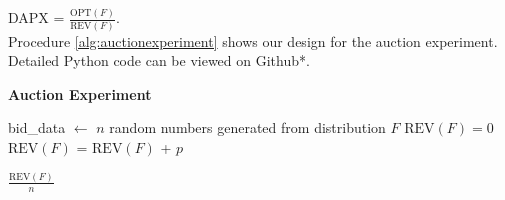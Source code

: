 DAPX = $\frac{\text{OPT}(F)}{\text{REV}(F)}$.\\
Procedure \ref{alg:auctionexperiment} shows our design for the auction experiment. Detailed Python code can be viewed on Github*.
\begin{algorithm}
\caption{\textbf{Auction Experiment}} \label{alg:auctionexperiment}
\begin{algorithmic}[1]
	 
	
		\State bid\_data $\gets$ $n$ random numbers generated from distribution $F$ 
		\State $\text{REV}(F) = 0$
				\State $\text{REV}(F)$ = $\text{REV}(F)$ + $p$ 
			\EndIf
			
		\EndFor
		\State \Return $\frac{\text{REV}(F)}{n}$
	\EndProcedure	
\end{algorithmic}

\end{algorithm}

